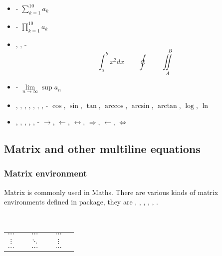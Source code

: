 \begin{frame}
	\begin{itemize}
		\item {} - $\sum\limits_{k=1}^{10}a_k$
		\item {} - $\prod\limits_{k=1}^{10}a_k$
		\item {},  , - $$\int_a^bx^2dx\qquad\oint\qquad\iint\limits_A^{\quad B}$$
		\item {} - $\lim\limits_{n\to\infty}\sup a_n$
		\item {}, , , , , , ,  - $\cos$, $\sin$, $\tan$, $\arccos$, $\arcsin$, $\arctan$, $\log$, $\ln$
		\item {}, , , , ,  - $\rightarrow$, $\leftarrow$, $\leftrightarrow$, $\Rightarrow$, $\longleftarrow$, $\Longleftrightarrow$
	\end{itemize}
\end{frame}

\subsection{Matrix and other multiline equations}

\begin{frame}
	\frametitle{Matrix environment}
	Matrix is commonly used in Maths. There are various kinds of matrix environments defined in  package, they are , , , , , .
	\begin{command}
		\\
		\qquad \begin{tabular}{cccccc}
			$\cdots$ & \structure{\&} & $\cdots$ & \structure{\&} & $\cdots$ & \samplecommand{\textbackslash} \\
			$\vdots$ & \structure{\&} & $\ddots$ & \structure{\&} & $\vdots$ & \samplecommand{\textbackslash} \\
			$\cdots$ & \structure{\&} & $\cdots$ & \structure{\&} & $\cdots$ & \samplecommand{\textbackslash} \\
		\end{tabular}\\
		\\
	\end{command}	
\end{frame}

